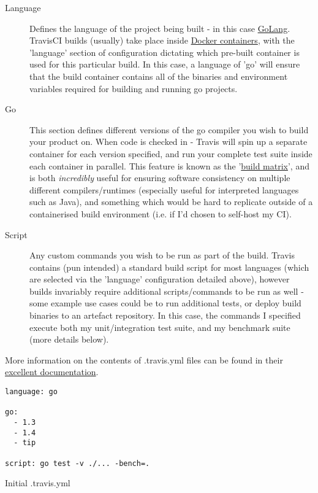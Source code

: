 \begin{description}
  \item[Language] Defines the language of the project being built - in this case
  \href{https://golang.org/}{GoLang}. TravisCI builds (usually) take place
  inside \href{https://www.docker.com/what-docker}{Docker containers}, with the
  'language' section of configuration dictating which pre-built container is used for
  this particular build. In this case, a language of 'go' will ensure that the
  build container contains all of the binaries and environment variables required
  for building and running go projects.
  \item[Go] This section defines different versions of the go compiler you wish
  to build your product on. When code is checked in - Travis will spin up a
  separate container for each version specified, and run your complete test suite
  inside each container in parallel. This feature is known as the
  '\href{https://docs.travis-ci.com/user/customizing-the-build/#Build-Matrix}{build matrix}',
  and is both \emph{incredibly} useful for ensuring software consistency on multiple
  different compilers/runtimes (especially useful for interpreted languages such
  as Java), and something which would be hard to replicate outside of a
  containerised build environment (i.e. if I'd chosen to self-host my CI).
  \item[Script] Any custom commands you wish to be run as part of the build.
  Travis contains (pun intended) a standard build script for most languages (which
  are selected via the 'language' configuration detailed above), however builds
  invariably require additional scripts/commands to be run as well - some example
  use cases could be to run additional tests, or deploy build binaries to an
  artefact repository. In this case, the commands I specified execute both my
  unit/integration test suite, and my benchmark suite (more details below).
\end{description}

More information on the contents of .travis.yml files can be found in their
\href{https://docs.travis-ci.com/}{excellent documentation}.

\begin{listing}
  \centering
  \begin{verbatim}
language: go

go:
  - 1.3
  - 1.4
  - tip

script: go test -v ./... -bench=.
  \end{verbatim}
  \caption{Initial .travis.yml}
  \label{lst:initialTravis}
\end{listing}


